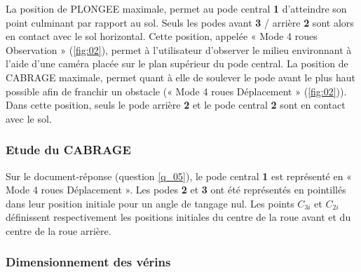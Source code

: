 La position de PLONGEE maximale, permet au pode central \textbf{1} d’atteindre son point culminant par rapport au sol. Seuls les podes avant \textbf{3} / arrière \textbf{2} sont alors en contact avec le sol horizontal. Cette position, appelée « Mode 4 roues Observation » (\autoref{fig:02}), permet à l’utilisateur d’observer le milieu environnant à l’aide d’une caméra placée sur le plan supérieur du pode central. La position de CABRAGE maximale, permet quant à elle de soulever le pode avant le plus haut possible afin de franchir un obstacle (« Mode 4 roues Déplacement » (\autoref{fig:02})). Dans cette position, seuls le pode arrière \textbf{2} et le pode central \textbf{2} sont en contact avec le sol.
\fi

\subsubsection{Etude du CABRAGE}
\ifprof
\else


Sur le document-réponse (question \ref{q_05}), le pode central \textbf{1} est représenté en « Mode 4 roues Déplacement ». Les podes \textbf{2} et \textbf{3} ont été représentés en pointillés dans leur position initiale pour un angle de tangage nul. Les points $C_{3i}$ et $C_{2i}$ définissent respectivement les positions initiales du centre de la roue avant et du centre de la roue arrière.
\fi

\ifprof
\begin{corrige}
\end{corrige}
\else
\fi


\subsubsection{Dimensionnement des vérins}
\ifprof
\else

